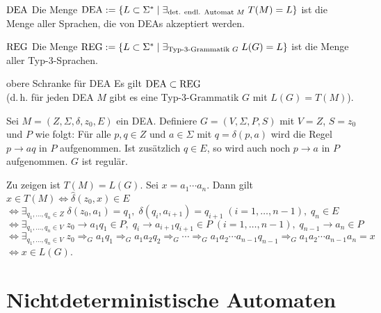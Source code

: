 \linie
\pagebreak

\begin{Def}{$\text{DEA}$}
    Die Menge $\text{DEA} := \{L \subset \Sigma^\ast \;|\;
    \exists_{\text{det. endl. Automat } M}\; T(M) = L\}$
    ist die Menge aller Sprachen, die von DEAs akzeptiert werden.
\end{Def}

\begin{Def}{$\text{REG}$}
    Die Menge $\text{REG} := \{L \subset \Sigma^\ast \;|\;
    \exists_{\text{Typ-3-Grammatik } G}\; L(G) = L\}$
    ist die Menge aller Typ-3-Sprachen.
\end{Def}

\begin{Satz}{obere Schranke für DEA}
    Es gilt $\text{DEA} \subset \text{REG}$\\
    (d.\,h. für jeden DEA $M$ gibt es eine Typ-3-Grammatik
    $G$ mit $L(G) = T(M)$).
\end{Satz}

\begin{Beweis}
    Sei $M = (Z, \Sigma, \delta, z_0, E)$ ein DEA.
    Definiere $G = (V, \Sigma, P, S)$ mit $V = Z$, $S = z_0$ und $P$ wie folgt:
    Für alle $p, q \in Z$ und $a \in \Sigma$ mit $q = \delta(p, a)$ wird
    die Regel $p \rightarrow aq$ in $P$ aufgenommen.
    Ist zusätzlich $q \in E$, so wird auch noch $p \rightarrow a$ in $P$
    aufgenommen.
    $G$ ist regulär.

    Zu zeigen ist $T(M) = L(G)$.
    Sei $x = a_1 \dotsb a_n$. Dann gilt
    $x \in T(M)
    \iff \widehat{\delta}(z_0, x) \in E$\\
    $\iff \exists_{q_1, \dotsc, q_n \in Z}\; \delta(z_0, a_1) = q_1,\;
    \delta(q_i, a_{i+1}) = q_{i+1}\; (i = 1, \dotsc, n - 1),\;
    q_n \in E$\\
    $\iff \exists_{q_1, \dotsc, q_n \in V}\; z_0 \rightarrow a_1 q_1 \in P,\;
    q_i \rightarrow a_{i+1} q_{i+1} \in P\; (i = 1, \dotsc, n - 1),\;
    q_{n-1} \rightarrow a_n \in P$\\
    $\iff \exists_{q_1, \dotsc, q_n \in V}\;
    z_0 \Rightarrow_G a_1 q_1 \Rightarrow_G a_1 a_2 q_2 \Rightarrow_G
    \dotsb \Rightarrow_G a_1 a_2 \dotsb a_{n-1} q_{n-1} \Rightarrow_G
    a_1 a_2 \dotsb a_{n-1} a_n = x$\\
    $\iff x \in L(G)$.
\end{Beweis}

\section{%
    Nichtdeterministische Automaten%
}

